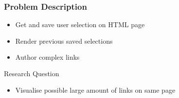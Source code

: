 \begin{frame}
	\frametitle{Problem Description}
	\begin{block}{}
		\begin{itemize}
			\item Get and save user selection on HTML page
			\item Render previous saved selections
			\item Author complex links 
		\end{itemize}
	\end{block}
	\begin{block}{Research Question}
		\begin{itemize}
			\item Visualise possible large amount of links on same page
		\end{itemize}
	\end{block}
\end{frame}
